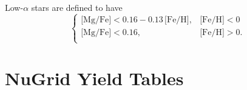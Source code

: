 \documentclass[fleqn,
usenatbib]{mnras}
\begin{document}
Low-$\alpha$ stars are defined to have 
\begin{equation}\label{eq:high_alpha}
\begin{cases}
\text{[Mg/Fe]} <0.16-0.13\,\text{[Fe/H]}, & \text{[Fe/H]}<0\\
\text{[Mg/Fe]} <0.16, & \text{[Fe/H]}>0. \\
\end{cases}
\end{equation}



\section{NuGrid Yield Tables}


\bsp	%
\label{lastpage}
\end{document}
